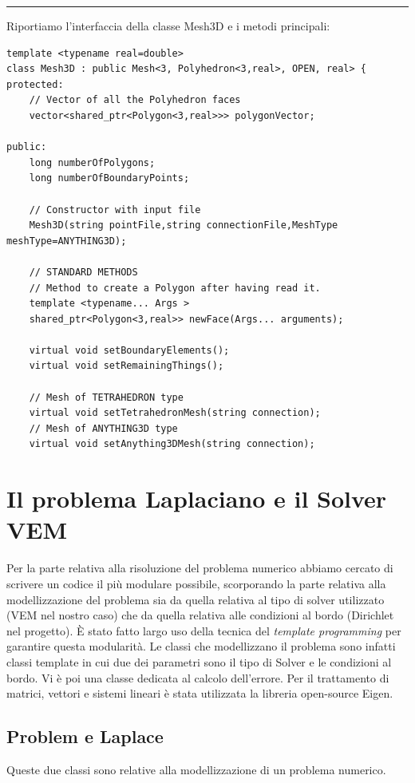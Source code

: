 \documentclass[oneside,12pt]{book}  %
\theoremstyle{plain}
\theoremstyle{definition}
\theoremstyle{remark}
\numberwithin{equation}{chapter} %
\begin{document}
\noindent\rule{14cm}{1pt}

Riportiamo l'interfaccia della classe Mesh3D e i metodi principali:

\begin{verbatim}
template <typename real=double>
class Mesh3D : public Mesh<3, Polyhedron<3,real>, OPEN, real> {
protected:
    // Vector of all the Polyhedron faces
    vector<shared_ptr<Polygon<3,real>>> polygonVector;  

public:
    long numberOfPolygons;
    long numberOfBoundaryPoints;

    // Constructor with input file
    Mesh3D(string pointFile,string connectionFile,MeshType meshType=ANYTHING3D);
	
    // STANDARD METHODS
    // Method to create a Polygon after having read it.
    template <typename... Args >
    shared_ptr<Polygon<3,real>> newFace(Args... arguments);

    virtual void setBoundaryElements();
    virtual void setRemainingThings();

    // Mesh of TETRAHEDRON type
    virtual void setTetrahedronMesh(string connection);
    // Mesh of ANYTHING3D type
    virtual void setAnything3DMesh(string connection);

\end{verbatim}

\section{Il problema Laplaciano e il Solver VEM}
\label{sec:solver}
Per la parte relativa alla risoluzione del problema numerico abbiamo
cercato di scrivere un codice il pi\`u modulare possibile, scorporando
la parte relativa alla modellizzazione del problema sia da quella relativa
al tipo di solver utilizzato (VEM nel nostro caso) che da quella
relativa alle condizioni al bordo (Dirichlet nel progetto). \`E stato fatto
largo uso della tecnica del \textit{template programming} per
garantire questa modularit\`a. 
Le classi che modellizzano il problema sono infatti classi template in
cui due dei parametri sono il tipo di Solver e le condizioni al bordo.
Vi \`e poi una classe dedicata al calcolo dell'errore.
Per il trattamento di matrici, vettori e sistemi lineari \`e stata
utilizzata la libreria open-source Eigen.

\subsection{Problem e Laplace}
Queste due classi sono relative alla modellizzazione di un problema
numerico. 
\end{document}
